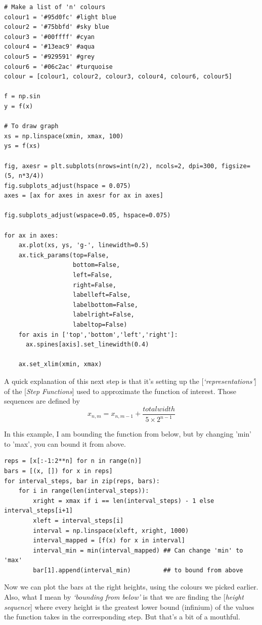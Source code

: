 \begin{verbatim}
# Make a list of 'n' colours
colour1 = '#95d0fc' #light blue
colour2 = '#75bbfd' #sky blue
colour3 = '#00ffff' #cyan
colour4 = '#13eac9' #aqua
colour5 = '#929591' #grey
colour6 = '#06c2ac' #turquoise
colour = [colour1, colour2, colour3, colour4, colour6, colour5]

f = np.sin
y = f(x)

# To draw graph
xs = np.linspace(xmin, xmax, 100)
ys = f(xs)

fig, axesr = plt.subplots(nrows=int(n/2), ncols=2, dpi=300, figsize=(5, n*3/4))
fig.subplots_adjust(hspace = 0.075)
axes = [ax for axes in axesr for ax in axes]

fig.subplots_adjust(wspace=0.05, hspace=0.075)

for ax in axes:
    ax.plot(xs, ys, 'g-', linewidth=0.5) 
    ax.tick_params(top=False, 
                   bottom=False, 
                   left=False, 
                   right=False, 
                   labelleft=False, 
                   labelbottom=False, 
                   labelright=False,
                   labeltop=False)
    for axis in ['top','bottom','left','right']:
      ax.spines[axis].set_linewidth(0.4)

    ax.set_xlim(xmin, xmax)    
\end{verbatim}
    
A quick explanation of this next step is that it's setting up the [\emph{`representations'}] of the
[\emph{Step Functions}] used to approximate the function of interest. Those sequences are defined by $$x_{n,m} = x_{n,m-1} + \frac{totalwidth}{5 \times 2^{n-1}}$$

In this example, I am bounding the function from below, but by changing 'min' to 'max', you can bound it from above.

\begin{verbatim}
reps = [x[:-1:2**n] for n in range(n)]
bars = [(x, []) for x in reps]
for interval_steps, bar in zip(reps, bars):
    for i in range(len(interval_steps)):
        xright = xmax if i == len(interval_steps) - 1 else interval_steps[i+1]
        xleft = interval_steps[i]
        interval = np.linspace(xleft, xright, 1000)
        interval_mapped = [f(x) for x in interval]
        interval_min = min(interval_mapped) ## Can change 'min' to 'max'
        bar[1].append(interval_min)         ## to bound from above
\end{verbatim}
      
Now we can plot the bars at the right heights, using the colours we picked earlier.  Also, what I mean by \emph{`bounding from below'} is that we are finding the [\emph{height sequence}] where every height is the greatest lower bound (infinium) of the values the function takes in the corresponding step. But that's a bit of a mouthful.

